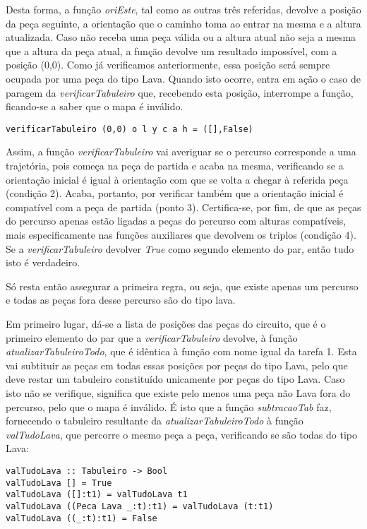 \documentclass[a4paper]{report}
\begin{document}
Desta forma, a função \textit{oriEste}, tal como as outras três referidas, devolve a posição da peça seguinte, a orientação que o caminho toma ao entrar na mesma e a altura atualizada. Caso não receba uma peça válida ou a altura atual não seja a mesma que a altura da peça atual, a função devolve um resultado impossível, com a posição (0,0). Como já verificamos anteriormente, essa posição será sempre ocupada por uma peça do tipo Lava. Quando isto ocorre, entra em ação o caso de paragem da \textit{verificarTabuleiro} que, recebendo esta posição, interrompe a função, ficando-se a saber que o mapa é inválido.

\begin{verbatim}
verificarTabuleiro (0,0) o l y c a h = ([],False)
\end{verbatim}

Assim, a função \textit{verificarTabuleiro} vai averiguar se o percurso corresponde a uma trajetória, pois começa na peça de partida e acaba na mesma, verificando se a orientação inicial é igual à orientação com que se volta a chegar à referida peça (condição 2). Acaba, portanto, por verificar também que a orientação inicial é compatível com a peça de partida (ponto 3). Certifica-se, por fim, de que as peças do percurso apenas estão ligadas a peças do percurso com alturas compatíveis, mais especificamente nas funções auxiliares que devolvem os triplos (condição 4). Se a \textit{verificarTabuleiro} devolver \textit{True} como segundo elemento do par, então tudo isto é verdadeiro.

Só resta então assegurar a primeira regra, ou seja, que existe apenas um percurso e todas as peças fora desse percurso são do tipo lava. 

Em primeiro lugar, dá-se a lista de posições das peças do circuito, que é o primeiro elemento do par que a  \textit{verificarTabuleiro} devolve, à função \textit{atualizarTabuleiroTodo}, que é idêntica à função com nome igual da tarefa 1. Esta vai subtituir as peças em todas essas posições por peças do tipo Lava, pelo que deve restar um tabuleiro constituído unicamente por peças do tipo Lava. Caso isto não se verifique, significa que existe pelo menos uma peça não Lava fora do percurso, pelo que o mapa é inválido. É isto que a função \textit{subtracaoTab} faz, fornecendo o tabuleiro resultante da \textit{atualizarTabuleiroTodo} à função \textit{valTudoLava}, que percorre o mesmo peça a peça, verificando se são todas do tipo Lava:

\begin{verbatim}
valTudoLava :: Tabuleiro -> Bool
valTudoLava [] = True
valTudoLava ([]:t1) = valTudoLava t1
valTudoLava ((Peca Lava _:t):t1) = valTudoLava (t:t1)
valTudoLava ((_:t):t1) = False
\end{verbatim}
\end{document}
